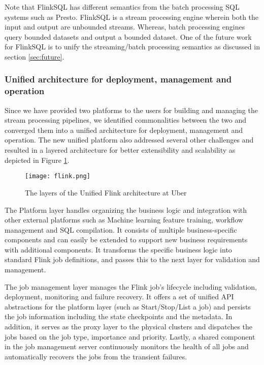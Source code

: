\documentclass[sigconf]{acmart}
\begin{document}
Note that FlinkSQL has different semantics from the batch processing SQL systems such as Presto. FlinkSQL is a stream processing engine wherein both the input and output are unbounded streams. Whereas, batch processing engines query bounded datasets and output a bounded dataset. One of the future work for FlinkSQL is to unify the streaming/batch processing semantics as discussed in section \ref{sec:future}.

\subsubsection{Unified architecture for deployment, management and operation} \label{sec:unified-flink-architecture}

Since we have provided two platforms to the users for building and managing the stream processing pipelines, we identified commonalities between the two and converged them into a unified architecture for deployment, management and operation. The new unified platform also addressed several other challenges and resulted in a layered architecture for better extensibility and scalability as depicted in Figure \ref{fig:flink}. 

\begin{figure}[h]
  \centering
  \texttt{[image: flink.png]}
  \caption{The layers of the Unified Flink architecture at Uber}
  \label{fig:flink}
\end{figure}

The Platform layer handles organizing the business logic and integration with other external platforms such as Machine learning feature training, workflow management and SQL compilation. It consists of multiple business-specific components and can easily be extended to support new business requirements with additional components. It transforms the specific business logic into standard Flink job definitions, and passes this to the next layer for validation and management.

The job management layer manages the Flink job's lifecycle including validation, deployment, monitoring and failure recovery. It offers a set of unified API abstractions for the platform layer (such as Start/Stop/List a job) and persists the job information including the state checkpoints and the metadata. In addition, it serves as the proxy layer to the physical clusters and dispatches the jobs based on the job type, importance and priority. Lastly, a shared component in the job management server continuously monitors the health of all jobs and automatically recovers the jobs from the transient failures.
\end{document}
